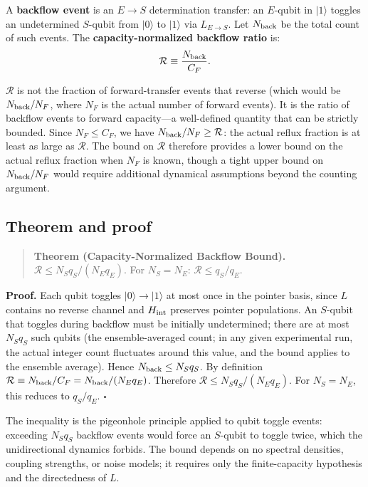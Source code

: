 \documentclass[aps,prl,twocolumn,superscriptaddress,hyperref]{revtex4-2}
\begin{document}
A \textbf{backflow event} is an $E \to S$ determination transfer: an $E$-qubit in $|1\rangle$ toggles an undetermined $S$-qubit from $|0\rangle$ to $|1\rangle$ via $L_{E\to S}$. Let $N_{\rm back}$ be the total count of such events. The \textbf{capacity-normalized backflow ratio} is:
\begin{equation}
\mathcal{R} \equiv \frac{N_{\rm back}}{C_F}.
\end{equation}

$\mathcal{R}$ is not the fraction of forward-transfer events that reverse (which would be $N_{\rm back}/N_F$, where $N_F$ is the actual number of forward events). It is the ratio of backflow events to forward capacity---a well-defined quantity that can be strictly bounded. Since $N_F \leq C_F$, we have $N_{\rm back}/N_F \geq \mathcal{R}$: the actual reflux fraction is at least as large as $\mathcal{R}$. The bound on $\mathcal{R}$ therefore provides a lower bound on the actual reflux fraction when $N_F$ is known, though a tight upper bound on $N_{\rm back}/N_F$ would require additional dynamical assumptions beyond the counting argument.

\subsection{Theorem and proof}

\begin{quote}
\textbf{Theorem (Capacity-Normalized Backflow Bound).}
$\mathcal{R} \leq N_S q_S / (N_E q_E)$.
For $N_S = N_E$: $\mathcal{R} \leq q_S/q_E$.
\end{quote}

\textbf{Proof.}
Each qubit toggles $|0\rangle \to |1\rangle$ at most once in the pointer basis, since $L$ contains no reverse channel and $H_{\rm int}$ preserves pointer populations. An $S$-qubit that toggles during backflow must be initially undetermined; there are at most $N_S q_S$ such qubits (the ensemble-averaged count; in any given experimental run, the actual integer count fluctuates around this value, and the bound applies to the ensemble average). Hence $N_{\rm back} \leq N_S q_S$. By definition $\mathcal{R} \equiv N_{\rm back}/C_F = N_{\rm back}/(N_E q_E)$. Therefore $\mathcal{R} \leq N_S q_S/(N_E q_E)$. For $N_S = N_E$, this reduces to $q_S/q_E$. $\square$

The inequality is the pigeonhole principle applied to qubit toggle events: exceeding $N_S q_S$ backflow events would force an $S$-qubit to toggle twice, which the unidirectional dynamics forbids. The bound depends on no spectral densities, coupling strengths, or noise models; it requires only the finite-capacity hypothesis and the directedness of $L$.
\end{document}
